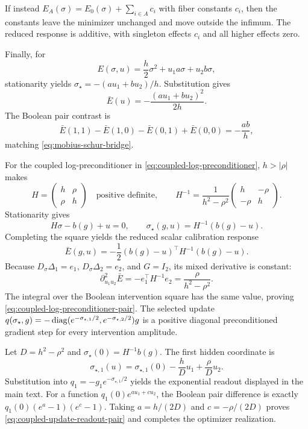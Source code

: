 If instead $E_A(\sigma)=E_0(\sigma)+\sum_{i\in A}c_i$ with fiber constants $c_i$, then the constants leave the minimizer unchanged and move outside the infimum.  The reduced response is additive, with singleton effects $c_i$ and all higher effects zero.

Finally, for
\[
E(\sigma,u)=\frac h2\sigma^2+u_1a\sigma+u_2b\sigma,
\]
stationarity yields $\sigma_\star=-(au_1+bu_2)/h$.  Substitution gives
\[
\bar E(u)=-\frac{(au_1+bu_2)^2}{2h}.
\]
The Boolean pair contrast is
\[
\bar E(1,1)-\bar E(1,0)-\bar E(0,1)+\bar E(0,0)
=-\frac{ab}{h},
\]
matching \cref{eq:mobius-schur-bridge}.

For the coupled log-preconditioner in
\cref{eq:coupled-log-preconditioner}, $h>|\rho|$ makes
\[
H=\begin{pmatrix}h&\rho\\ \rho&h\end{pmatrix}
\quad\text{positive definite},\qquad
H^{-1}=\frac1{h^2-\rho^2}
\begin{pmatrix}h&-\rho\\-\rho&h\end{pmatrix}.
\]
Stationarity gives
\[
H\sigma-b(g)+u=0,
\qquad
\sigma_\star(g,u)=H^{-1}(b(g)-u).
\]
Completing the square yields the reduced scalar calibration response
\[
\bar E(g,u)
=-\frac12(b(g)-u)^\top H^{-1}(b(g)-u).
\]
Because $D_\sigma\Delta_1=e_1$, $D_\sigma\Delta_2=e_2$, and
$G=I_2$, its mixed derivative is constant:
\[
\partial_{u_1u_2}^2\bar E
=-e_1^\top H^{-1}e_2
=\frac{\rho}{h^2-\rho^2}.
\]
The integral over the Boolean intervention square has the same value, proving
\cref{eq:coupled-log-preconditioner-pair}.  The selected update
$q(\sigma_\star,g)=-\operatorname{diag}(e^{-\sigma_{\star,1}/2},
e^{-\sigma_{\star,2}/2})g$ is a positive diagonal preconditioned gradient
step for every intervention amplitude.

Let $D=h^2-\rho^2$ and $\sigma_\star(0)=H^{-1}b(g)$.  The first hidden
coordinate is
\[
\sigma_{\star,1}(u)
=\sigma_{\star,1}(0)-\frac hD u_1+\frac\rho D u_2.
\]
Substitution into $q_1=-g_1e^{-\sigma_{\star,1}/2}$ yields the exponential
readout displayed in the main text.  For a function
$q_1(0)e^{a u_1+c u_2}$, the Boolean pair difference is exactly
$q_1(0)(e^a-1)(e^c-1)$.  Taking $a=h/(2D)$ and
$c=-\rho/(2D)$ proves \cref{eq:coupled-update-readout-pair} and completes the
optimizer realization.
